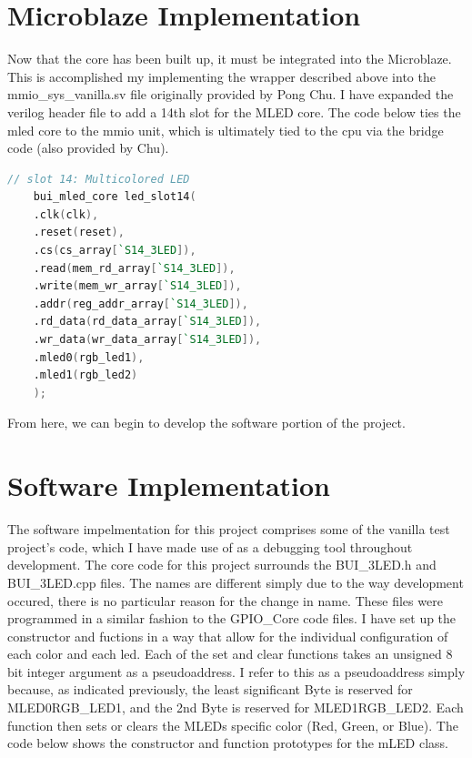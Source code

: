 \documentclass{article}
\begin{document}
\section{Microblaze Implementation}
Now that the core has been built up, it must be integrated into the Microblaze. This is accomplished my implementing the wrapper described above into the mmio\_sys\_vanilla.sv file originally provided by Pong Chu. I have expanded the verilog header file to add a 14th slot for the MLED core. The code below ties the mled core to the mmio unit, which is ultimately tied to the cpu via the bridge code (also provided by Chu).

\newpage

\begin{lstlisting}[language=Verilog]
    // slot 14: Multicolored LED
    bui_mled_core led_slot14(
    .clk(clk),
    .reset(reset),
    .cs(cs_array[`S14_3LED]),
    .read(mem_rd_array[`S14_3LED]),
    .write(mem_wr_array[`S14_3LED]),
    .addr(reg_addr_array[`S14_3LED]),
    .rd_data(rd_data_array[`S14_3LED]),
    .wr_data(wr_data_array[`S14_3LED]),
    .mled0(rgb_led1),
    .mled1(rgb_led2)
    );
\end{lstlisting}

From here, we can begin to develop the software portion of the project.


\section{Software Implementation}
The software impelmentation for this project comprises some of the vanilla test project's code, which I have made use of as a debugging tool throughout development. The core code for this project surrounds the BUI\_3LED.h and BUI\_3LED.cpp files. The names are different simply due to the way development occured, there is no particular reason for the change in name. These files were programmed in a similar fashion to the GPIO\_Core code files. I have set up the constructor and fuctions in a way that allow for the individual configuration of each color and each led. Each of the set and clear functions takes an unsigned 8 bit integer argument as a pseudoaddress. I refer to this as a pseudoaddress simply because, as indicated previously, the least significant Byte is reserved for MLED0\/RGB\_LED1, and the 2nd Byte is reserved for MLED1\/RGB\_LED2. Each function then sets or clears the MLEDs specific color (Red, Green, or Blue). The code below shows the constructor and function prototypes for the mLED class.
\end{document}
